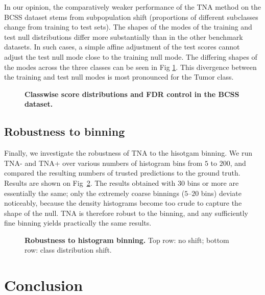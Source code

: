 \documentclass[10pt,letterpaper]{article}
\begin{document}
In our opinion, the comparatively weaker performance of the TNA method on the BCSS dataset stems from subpopulation shift (proportions of different subclasses change from training to test sets). 
The shapes of the modes of the training and test null distributions differ more substantially than in the other benchmark datasets.
In such cases, a simple affine adjustment of the test scores cannot adjust the test null mode close to the training null mode. 
The differing shapes of the modes across the three classes can be seen in Fig \ref{fig:BCSS-classwise}. 
This divergence between the training and test null modes is most pronounced for the Tumor class.

\begin{figure}[h!]
	\centering	
	\caption{{\bf Classwise score distributions and FDR control in the BCSS dataset.}}
	\label{fig:BCSS-classwise}
\end{figure}


\subsection*{Robustness to binning}
Finally, we investigate the robustness of TNA to the hisotgam binning. We run TNA- and TNA+
over various numbers of histogram bins from $5$ to $200$, and compared the resulting numbers of trusted
predictions to the ground truth. Results are shown on Fig~\ref{fig:binning}. The results obtained with $30$ 
bins or more are essentially the same; only the extremely coarse binnings
($5$--$20$ bins) deviate noticeably, because the density histograms become
too crude to capture the shape of the null. TNA is therefore robust to the binning,
and any sufficiently fine binning yields practically the same results.

\begin{figure}[h!]
	\centering	
	\caption{{\bf Robustness to histogram binning.} Top row: no shift; bottom row: class distribution shift.}
	\label{fig:binning}
\end{figure}



 


\section*{Conclusion}
\end{document}
